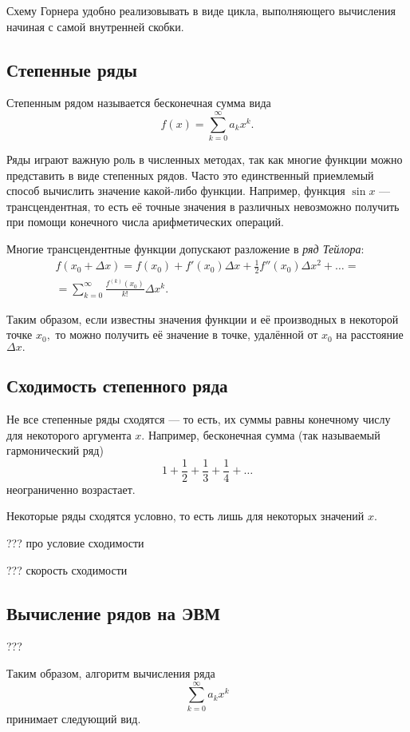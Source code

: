 Схему Горнера удобно реализовывать в виде цикла, выполняющего вычисления
начиная с самой внутренней скобки.


\subsection{Степенные ряды}

Степенным рядом называется бесконечная сумма вида
\[
f(x)=\sum_{k=0}^{\infty}a_{k}x^{k}.
\]


Ряды играют важную роль в численных методах, так как многие функции
можно представить в виде степенных рядов. Часто это единственный приемлемый
способ вычислить значение какой-либо функции. Например, функция $\sin x$
— трансцендентная, то есть её точные значения в различных невозможно
получить при помощи конечного числа арифметических операций.

Многие трансцендентные функции допускают разложение в \emph{ряд Тейлора}:
\begin{multline*}
f(x_{0}+\Delta x)=f(x_{0})+f'(x_{0})\Delta x+\frac{1}{2}f''(x_{0})\Delta x^{2}+\ldots=\\
=\sum_{k=0}^{\infty}\frac{f^{(k)}(x_{0})}{k!}\Delta x^{k}.
\end{multline*}


Таким образом, если известны значения функции и её производных в некоторой
точке $x_{0},$ то можно получить её значение в точке, удалённой от
$x_{0}$ на расстояние $\Delta x.$


\subsection{Сходимость степенного ряда}

Не все степенные ряды сходятся — то есть, их суммы равны конечному
числу для некоторого аргумента $x$. Например, бесконечная сумма (так
называемый гармонический ряд) 
\[
1+\frac{1}{2}+\frac{1}{3}+\frac{1}{4}+\dots
\]
неограниченно возрастает.

Некоторые ряды сходятся условно, то есть лишь для некоторых значений
$x$. 

??? про условие сходимости

??? скорость сходимости


\subsection{Вычисление рядов на ЭВМ}

???

Таким образом, алгоритм вычисления ряда 
\[
\sum_{k=0}^{\infty}a_{k}x^{k}
\]
принимает следующий вид.



